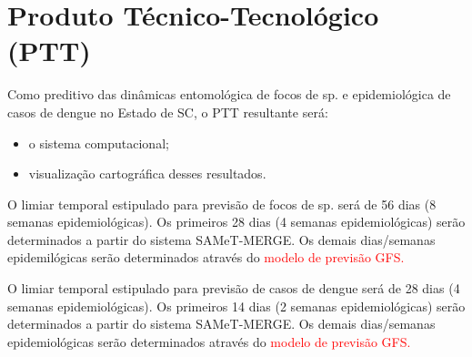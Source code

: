 


\section{Produto Técnico-Tecnológico (PTT)} 

\indent Como preditivo das dinâmicas entomológica de focos de  sp. e epidemiológica de casos de dengue no Estado de \acrlong{SC}, o \acrshort{PTT} resultante será:

\begin{itemize}
  \item o sistema computacional;
  \item visualização cartográfica desses resultados.
\end{itemize}

\indent O limiar temporal estipulado para previsão de focos de  sp. será de 56 dias (8 semanas epidemiológicas). Os primeiros 28 dias (4 semanas epidemiológicas) serão determinados a partir do sistema \acrshort{SAMeT}-\acrshort{MERGE}. Os demais dias/semanas epidemilógicas serão determinados através do \textcolor{red}{modelo de previsão \acrshort{GFS}.}

\indent O limiar temporal estipulado para previsão de casos de dengue será de 28 dias (4 semanas epidemiológicas). Os primeiros 14 dias (2 semanas epidemiológicas) serão determinados a partir do sistema \acrshort{SAMeT}-\acrshort{MERGE}. Os demais dias/semanas epidemiológicas serão determinados através do \textcolor{red}{modelo de previsão \acrshort{GFS}.}








